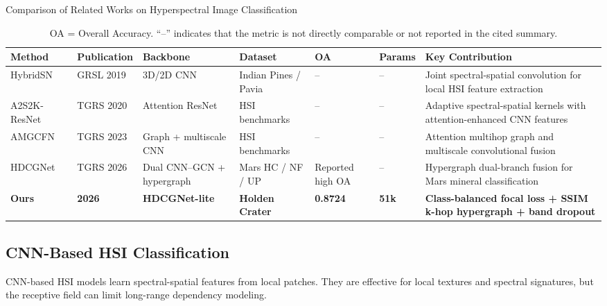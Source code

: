 \documentclass[conference]{IEEEtran}
\begin{document}
\begin{table}[t]
\centering
\caption{Comparison of Related Works on Hyperspectral Image Classification}
\label{tab:related}
\renewcommand{\arraystretch}{1.3}
\begin{tabular}{
    p{2.4cm}
    p{1.8cm}
    p{2.5cm}
    p{2.3cm}
    p{1.2cm}
    p{1.4cm}
    p{3.4cm}
}
\toprule
\textbf{Method} &
\textbf{Publication} &
\textbf{Backbone} &
\textbf{Dataset} &
\textbf{OA} &
\textbf{Params} &
\textbf{Key Contribution} \\
\midrule

HybridSN~\cite{hybridsn} &
GRSL 2019 &
3D/2D CNN &
Indian Pines / Pavia &
-- &
-- &
Joint spectral-spatial convolution for local HSI feature extraction \\

\midrule
A2S2K-ResNet~\cite{a2s2k} &
TGRS 2020 &
Attention ResNet &
HSI benchmarks &
-- &
-- &
Adaptive spectral-spatial kernels with attention-enhanced CNN features \\

\midrule
AMGCFN~\cite{amgcfn} &
TGRS 2023 &
Graph + multiscale CNN &
HSI benchmarks &
-- &
-- &
Attention multihop graph and multiscale convolutional fusion \\

\midrule
HDCGNet~\cite{original_paper} &
TGRS 2026 &
Dual CNN--GCN + hypergraph &
Mars HC / NF / UP &
Reported high OA &
-- &
Hypergraph dual-branch fusion for Mars mineral classification \\

\midrule
\rowcolor{yellow!20}
\textbf{Ours} &
\textbf{2026} &
\textbf{HDCGNet-lite} &
\textbf{Holden Crater} &
\textbf{0.8724} &
\textbf{51k} &
\textbf{Class-balanced focal loss + SSIM k-hop hypergraph + band dropout} \\

\bottomrule
\end{tabular}
\vspace{1mm}
\caption*{\small OA = Overall Accuracy. ``--'' indicates that the metric is not directly comparable or not reported in the cited summary.}
\end{table}

\subsection{CNN-Based HSI Classification}
CNN-based HSI models learn spectral-spatial features from local patches. They are effective for local textures and spectral signatures, but the receptive field can limit long-range dependency modeling.
\end{document}
